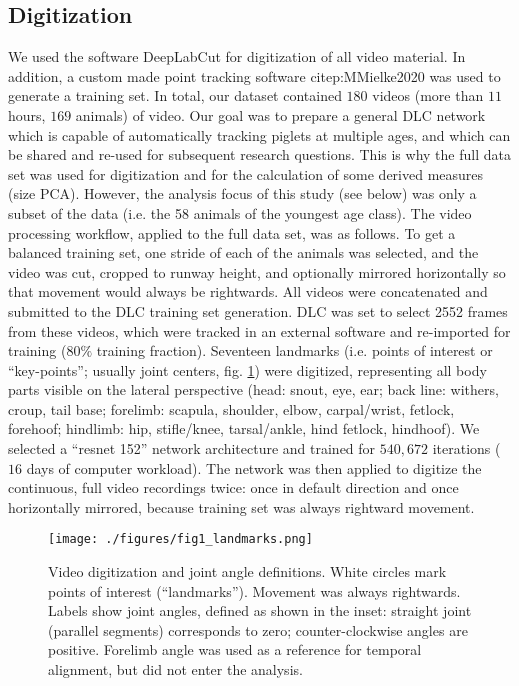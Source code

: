 \documentclass[10pt,a4paper]{article}
\begin{document}
\subsection{Digitization}
\label{sec:org3ecf574}
We used the software DeepLabCut \citep[DLC,][]{Mathis2018} for digitization of all video material.
In addition, a custom made point tracking software citep:MMielke2020 was used to generate a training set.
In total, our dataset contained \(180\) videos (more than \(11\) hours, \(169\) animals) of video.
Our goal was to prepare a general DLC network which is capable of automatically tracking piglets at multiple ages, and which can be shared and re-used for subsequent research questions.
This is why the full data set was used for digitization and for the calculation of some derived measures (size PCA).
However, the analysis focus of this study (see below) was only a subset of the data (i.e. the 58 animals of the youngest age class).
The video processing workflow, applied to the full data set, was as follows.
To get a balanced training set, one stride of each of the animals was selected, and the video was cut, cropped to runway height, and optionally mirrored horizontally so that movement would always be rightwards.
All videos were concatenated and submitted to the DLC training set generation.
DLC was set to select 2552 frames from these videos, which were tracked in an external software and re-imported for training (\(80 \%\) training fraction).
Seventeen landmarks (i.e. points of interest or ``key-points''; usually joint centers, fig. \ref{fig:landmarks}) were digitized, representing all body parts visible on the lateral perspective (head: snout, eye, ear; back line: withers, croup, tail base; forelimb: scapula, shoulder, elbow, carpal/wrist, fetlock, forehoof; hindlimb: hip, stifle/knee, tarsal/ankle, hind fetlock, hindhoof).
We selected a ``resnet 152'' network architecture and trained for \(540,672\) iterations (\(16\) days of computer workload).
The network was then applied to digitize the continuous, full video recordings twice: once in default direction and once horizontally mirrored, because training set was always rightward movement.

\begin{figure}[t]
\centering
\texttt{[image: ./figures/fig1\_landmarks.png]}
\caption{\label{fig:landmarks}Video digitization and joint angle definitions. White circles mark points of interest (``landmarks''). Movement was always rightwards. Labels show joint angles, defined as shown in the inset: straight joint (parallel segments) corresponds to zero; counter-clockwise angles are positive. Forelimb angle was used as a reference for temporal alignment, but did not enter the analysis.}
\end{figure}
\end{document}

